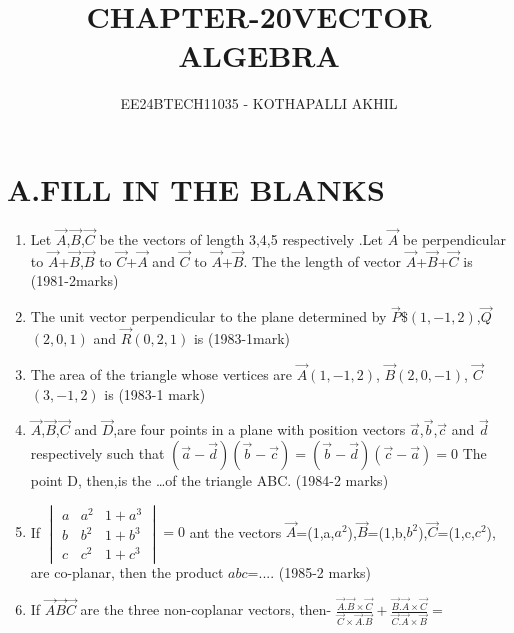 \documentclass[journal]{IEEEtran}
\numberwithin{equation}{enumi}
\numberwithin{figure}{enumi}
\begin{document}


\title{CHAPTER-20}
\title{VECTOR ALGEBRA}
\author{EE24BTECH11035 - KOTHAPALLI AKHIL}
{\let\newpage\relax\maketitle}

\section*{A.FILL IN THE BLANKS}
\begin{enumerate}
    \item Let $\Vec{A}$,$\vec{B}$,$\vec{C}$ be the vectors of length 3,4,5 respectively .Let $\vec{A}$ be perpendicular to $\vec{A}$+$\vec{B}$,$\vec{B}$ to $\vec{C}$+$\vec{A}$ and $\vec{C}$ to $\vec{A}$+$\vec{B}$. The the length of vector $\vec{A}$+$\vec{B}$+$\vec{C}$ is
    \hfill{(1981-2marks)}
    \item The unit vector perpendicular to the plane determined by $\vec{P}$$\$(1,-1,2)$,$\vec{Q}$$(2,0,1)$ and $\vec{R}$$(0,2,1)$ is
    \hfill{(1983-1mark)}
    \item The area of the triangle whose vertices are $\vec{A}$$(1,-1,2)$, $\vec{B}$$(2,0,-1)$, $\vec{C}$$(3,-1,2)$ is
    \hfill{(1983-1 mark)}
    \item $\vec{A}$,$\vec{B}$,$\vec{C}$ and $\vec{D}$,are four points in a plane with position vectors $\vec{a}$,$\vec{b}$,$\vec{c}$ and $\vec{d}$ respectively such that $(\vec{a}-\vec{d})(\vec{b}-\vec{c})=(\vec{b}-\vec{d})(\vec{c}-\vec{a})=0$
    The point D, then,is the \dots of the triangle ABC.
    \hfill{(1984-2 marks)}
    \item If $ 
 \begin{vmatrix}
a & a^2 & 1+a^3\\
b & b^2 & 1+b^3\\
c & c^2 & 1+c^3
\end{vmatrix}
=0$ ant the vectors $\vec{A}$=(1,a,$a^2$),$\vec{B}$=(1,b,$b^2$),$\vec{C}$=(1,c,$c^2$), are co-planar, then the product $abc$=....
\hfill{(1985-2 marks)}
\item If $\vec{A}$$\vec{B}$$\vec{C}$ are the three non-coplanar vectors, then- $\frac{\vec{A}.\vec{B}\times\vec{C}}{\vec{C}\times\vec{A}.\vec{B}}+\frac{\vec{B}.\vec{A}\times\vec{C}}{\vec{C}.\vec{A}\times\vec{B}}=$

\end{enumerate}
\end{document}
